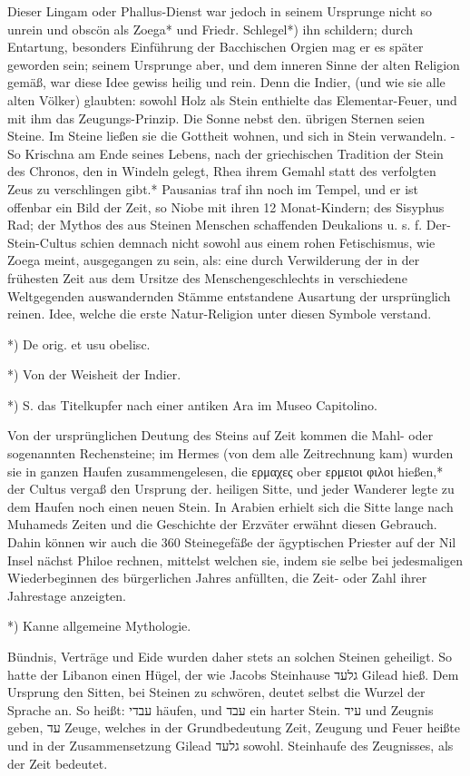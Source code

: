 \documentclass[a4paper, 11pt, oneside, polutonikogreek, german]{article}
\begin{document}
Dieser Lingam oder Phallus-Dienst war jedoch in seinem Ursprunge nicht so unrein und obscön als Zoega* und Friedr. Schlegel*) ihn schildern; durch Entartung, besonders Einführung der Bacchischen Orgien mag er es später geworden sein; seinem Ursprunge aber, und dem inneren Sinne der alten Religion gemäß, war diese Idee gewiss heilig und rein. Denn die Indier, (und wie sie alle alten Völker) glaubten: sowohl Holz als Stein enthielte das Elementar-Feuer, und mit ihm das Zeugungs-Prinzip. Die Sonne nebst den. übrigen Sternen seien Steine. Im Steine ließen sie die Gottheit wohnen, und sich in Stein verwandeln. - So Krischna am Ende seines Lebens, nach der griechischen Tradition der Stein des Chronos, den in Windeln gelegt, Rhea ihrem Gemahl statt des verfolgten Zeus zu verschlingen gibt.* Pausanias traf ihn noch im Tempel, und er ist offenbar ein Bild der Zeit, so Niobe mit ihren 12 Monat-Kindern; des Sisyphus Rad; der Mythos des aus Steinen Menschen schaffenden Deukalions u. s. f. Der-Stein-Cultus schien demnach nicht sowohl aus einem rohen Fetischismus, wie Zoega meint, ausgegangen zu sein, als: eine durch Verwilderung der in der frühesten Zeit aus dem Ursitze des Menschengeschlechts in verschiedene Weltgegenden auswandernden Stämme entstandene Ausartung der ursprünglich reinen. Idee, welche die erste Natur-Religion unter diesen Symbole verstand.

*) De orig. et usu obelisc.

*) Von der Weisheit der Indier.

*) S. das Titelkupfer nach einer antiken Ara im Museo Capitolino.

Von der ursprünglichen Deutung des Steins auf Zeit kommen die Mahl- oder sogenannten Rechensteine; im Hermes (von dem alle Zeitrechnung kam) wurden sie in ganzen Haufen zusammengelesen, die ερμαχες ober ερμειοι φιλοι hießen,* der Cultus vergaß den Ursprung der. heiligen Sitte, und jeder Wanderer legte zu dem Haufen noch einen neuen Stein. In Arabien erhielt sich die Sitte lange nach Muhameds Zeiten und die Geschichte der Erzväter erwähnt diesen Gebrauch. Dahin können wir auch die 360 Steinegefäße der ägyptischen Priester auf der Nil Insel nächst Philoe rechnen, mittelst welchen sie, indem sie selbe bei jedesmaligen Wiederbeginnen des bürgerlichen Jahres anfüllten, die Zeit- oder Zahl ihrer Jahrestage anzeigten.

*) Kanne allgemeine Mythologie.

Bündnis, Verträge und Eide wurden daher stets an solchen Steinen geheiligt. So hatte der Libanon einen Hügel, der wie Jacobs Steinhause גלעד Gilead hieß. Dem Ursprung den Sitten, bei Steinen zu schwören, deutet selbst die Wurzel der Sprache an. So heißt: עבדי häufen, und עבד ein harter Stein. עיד und Zeugnis geben, עד Zeuge, welches in der Grundbedeutung Zeit, Zeugung und Feuer heißte und in der Zusammensetzung Gilead גלעד sowohl. Steinhaufe des Zeugnisses, als der Zeit bedeutet.
\end{document}
